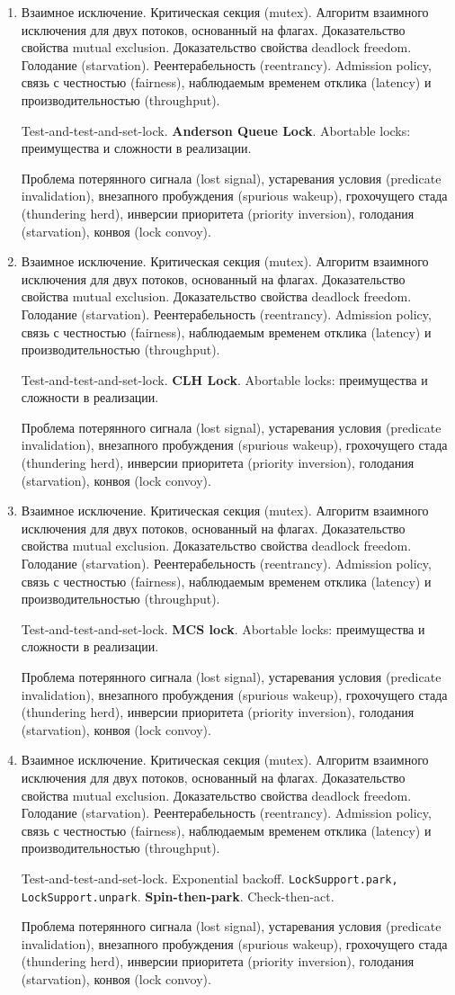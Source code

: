 \documentclass[a4paper, 12pt]{extarticle}
\newcommand{\mutexBasics}{Взаимное исключение. Критическая секция (mutex). Алгоритм взаимного исключения для двух потоков, основанный на флагах. Доказательство свойства mutual exclusion. Доказательство свойства deadlock freedom. Голодание (starvation).
Реентерабельность (reentrancy). Admission policy, связь с честностью (fairness), наблюдаемым временем отклика (latency) и производительностью (throughput).}
\newcommand{\commonProblems}{Проблема потерянного сигнала (lost signal), устаревания условия (predicate invalidation), внезапного пробуждения (spurious wakeup), грохочущего стада (thundering herd),
инверсии приоритета (priority inversion), голодания (starvation), конвоя (lock convoy). }
\begin{document}
\begin{enumerate}[\thesection .1]
	
	\item \mutexBasics

	\globMemOverview

	Test-and-test-and-set-lock. \textbf{Anderson Queue Lock}. Abortable locks: преимущества и сложности в реализации.

	\commonProblems		

	\item \mutexBasics

	\globMemOverview

	Test-and-test-and-set-lock. \textbf{CLH Lock}. Abortable locks: преимущества и сложности в реализации.

	\commonProblems		


	\item \mutexBasics

	\globMemOverview

	Test-and-test-and-set-lock. \textbf{MCS lock}. Abortable locks: преимущества и сложности в реализации.

	\commonProblems		

	\item \mutexBasics

	\globMemOverview

	Test-and-test-and-set-lock. Exponential backoff. \texttt{LockSupport.park, LockSupport.unpark}. \textbf{Spin-then-park}. Check-then-act.

	\commonProblems		
\end{enumerate}




% 
\end{document}
